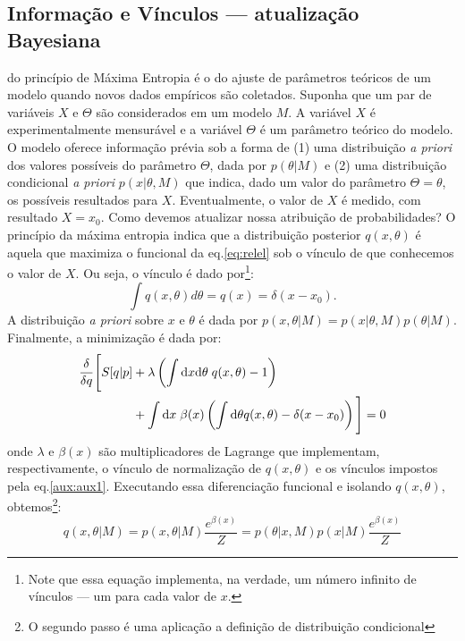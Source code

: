 \subsection{Informação e Vínculos --- atualização Bayesiana}
\label{sec:bayes}
 do princípio de Máxima Entropia é o do ajuste de parâmetros teóricos de um modelo quando novos dados empíricos são coletados. Suponha que um par de variáveis $X$ e $\Theta$ são considerados em um modelo $M$. A variável $X$ é experimentalmente mensurável e a variável $\Theta$ é um parâmetro teórico do modelo. O modelo oferece informação prévia sob a forma de (1) uma distribuição \emph{a priori} dos valores possíveis do parâmetro $\Theta$, dada por $p(\theta | M)$ e (2) uma distribuição condicional \emph{a priori}  $p(x | \theta, M)$ que indica, dado um valor do parâmetro $\Theta = \theta$, os possíveis resultados para $X$. Eventualmente, o valor de $X$ é medido, com resultado $X = x_0$. Como devemos atualizar nossa atribuição de probabilidades? O princípio da máxima entropia indica que a distribuição posterior $q(x,\theta)$ é aquela que maximiza o funcional da eq.\eqref{eq:relel} sob o vínculo de que conhecemos o valor de $X$. Ou seja, o vínculo é dado por\footnote{Note que essa equação implementa, na verdade, um número infinito de vínculos --- um para cada valor de $x$.}:
\begin{equation}
\label{aux:aux1}
 \int q(x, \theta) d\theta = q(x) = \delta(x-x_0).
\end{equation}
 A distribuição \emph{a priori} sobre $x$ e $\theta$ é dada por $p(x, \theta| M) = p(x|\theta, M) p(\theta| M)$. Finalmente, a minimização é dada por:
\begin{align}
 \frac{\delta}{\delta q} \Bigg[ S[q | p] &+ \lambda \left(\int \mathrm{d} x\mathrm{d}\theta\; q(x,\theta) -1 \right) \nonumber\\
  &+ \int \mathrm{d} x\; \beta(x) \left(\int\mathrm{d}\theta q(x,\theta) - \delta(x-x_0)\right)\Bigg] =0 \nonumber
\end{align}
onde $\lambda$ e $\beta(x)$ são multiplicadores de Lagrange que implementam, respectivamente, o vínculo de normalização de $q(x,\theta)$ e os vínculos impostos pela eq.\eqref{aux:aux1}. Executando essa diferenciação funcional e isolando $q(x,\theta)$, obtemos\footnote{O segundo passo é uma aplicação a definição de distribuição condicional}:
\begin{equation}
 q(x,\theta| M) = p(x,\theta| M)\frac{e^{\beta(x)}}{Z} = p(\theta|x, M)p(x |M)\frac{e^{\beta(x)}}{Z}
\end{equation}
